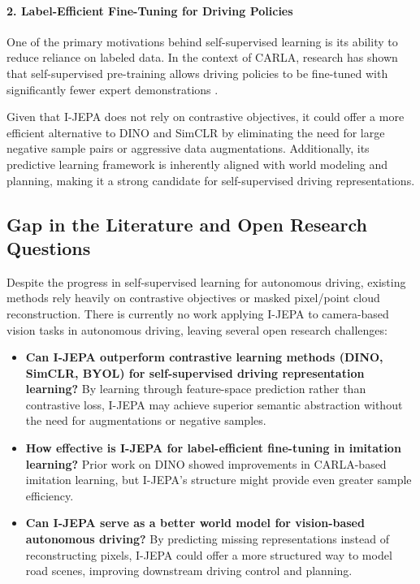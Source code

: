 \documentclass{article}
\begin{document}
\paragraph{2. Label-Efficient Fine-Tuning for Driving Policies}
One of the primary motivations behind self-supervised learning is its ability to reduce reliance on labeled data. In the context of CARLA, research has shown that self-supervised pre-training allows driving policies to be fine-tuned with significantly fewer expert demonstrations \citep{carla_ssl2024}. 

Given that I-JEPA does not rely on contrastive objectives, it could offer a more efficient alternative to DINO and SimCLR by eliminating the need for large negative sample pairs or aggressive data augmentations. Additionally, its predictive learning framework is inherently aligned with world modeling and planning, making it a strong candidate for self-supervised driving representations.

\subsection{Gap in the Literature and Open Research Questions}
Despite the progress in self-supervised learning for autonomous driving, existing methods rely heavily on contrastive objectives or masked pixel/point cloud reconstruction. There is currently no work applying I-JEPA to camera-based vision tasks in autonomous driving, leaving several open research challenges:


\begin{itemize}
    \item \textbf{Can I-JEPA outperform contrastive learning methods (DINO, SimCLR, BYOL) for self-supervised driving representation learning?} By learning through feature-space prediction rather than contrastive loss, I-JEPA may achieve superior semantic abstraction without the need for augmentations or negative samples.
    \item \textbf{How effective is I-JEPA for label-efficient fine-tuning in imitation learning?} Prior work on DINO showed improvements in CARLA-based imitation learning, but I-JEPA’s structure might provide even greater sample efficiency.
    \item \textbf{Can I-JEPA serve as a better world model for vision-based autonomous driving?} By predicting missing representations instead of reconstructing pixels, I-JEPA could offer a more structured way to model road scenes, improving downstream driving control and planning.
\end{itemize}
\end{document}
